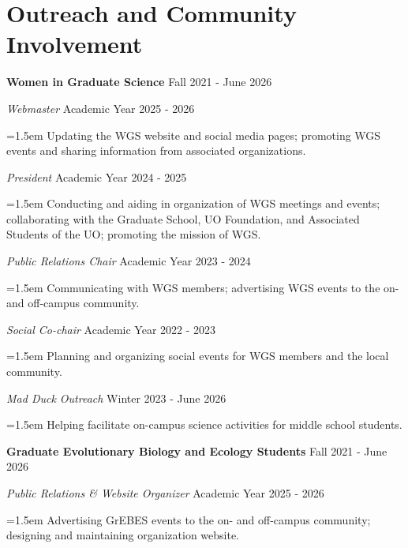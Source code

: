 \documentclass[11pt]{extarticle}
\newcommand{\NewPart}[1]{\section*{{#1}}}
\begin{document}
\NewPart{Outreach and Community Involvement}

\noindent \textbf{Women in Graduate Science}  \hfill Fall 2021 - June 2026 \par
\vspace{2mm}
\textit{Webmaster} \hfill Academic Year 2025 - 2026 \par
{\narrower \hangindent=1.5em {Updating the WGS website and social media pages; promoting WGS events and sharing information from associated organizations.} \normalsize \par }
\vspace{1mm}
\textit{President} \hfill Academic Year 2024 - 2025 \par
{\narrower \hangindent=1.5em {Conducting and aiding in organization of WGS meetings and events;
                                          collaborating with the Graduate School, UO Foundation, and Associated Students of the UO;
                                          promoting the mission of WGS.} \normalsize \par }
\vspace{1mm}
\textit{Public Relations Chair} \hfill Academic Year 2023 - 2024 \par
{\narrower \hangindent=1.5em {Communicating with WGS members; 
                                        advertising WGS events to the on- and off-campus community.} \normalsize \par }
\vspace{1mm}
\textit{Social Co-chair} \hfill Academic Year 2022 - 2023 \par
{\narrower \hangindent=1.5em {Planning and organizing social events for WGS members and the local community.} \normalsize \par }
\vspace{1mm}
\textit{Mad Duck Outreach} \hfill Winter 2023 - June 2026 \par
{\narrower \hangindent=1.5em {Helping facilitate on-campus science activities for middle school students.} \normalsize \par }
\vspace{2.5mm}
\noindent \textbf{Graduate Evolutionary Biology and Ecology Students} \hfill Fall 2021 - June 2026 \par
\vspace{2mm}
\textit{Public Relations \& Website Organizer} \hfill Academic Year 2025 - 2026 \par
{\narrower \hangindent=1.5em {Advertising GrEBES events to the on- and off-campus community;
                                          designing and maintaining organization website.} \normalsize \par }
\end{document}

